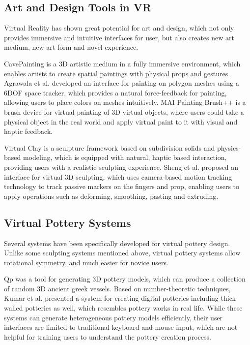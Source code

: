 \documentclass{svjour3}                     %
\begin{document}
\subsection{Art and Design Tools in VR}
\label{sec:2.2}
Virtual Reality has shown great potential for art and design, which not only provides immersive and intuitive interfaces for user, but also creates new art medium, new art form and novel experience\cite{laviola20113d}.

CavePainting \cite{keefe2001cavepainting} is a 3D artistic medium in a fully immersive environment, which enables artists to create spatial paintings with physical props and gestures. Agrawala et al.\cite{agrawala19953d} developed an interface for painting on polygon meshes using a 6DOF space tracker, which provides a natural force-feedback for painting, allowing users to place colors on meshes intuitively. MAI Painting Brush++ \cite{otsuki2017brush} is a brush device for virtual painting of 3D virtual objects, where users could take a physical object in the real world and apply virtual paint to it with visual and haptic feedback.

Virtual Clay \cite{mcdonnell2001virtual} is a sculpture framework based on subdivision solids and physics-based modeling, which is equipped with natural, haptic based interaction, providing users with a realistic sculpting experience. Sheng et al. \cite{sheng2006interface} proposed an interface for virtual 3D sculpting, which uses camera-based motion tracking technology to track passive markers on the fingers and prop, enabling users to apply operations such as deforming, smoothing, pasting and extruding.

\subsection{Virtual Pottery Systems}
\label{sec:2.3}


Several systems have been specifically developed for virtual pottery design. Unlike some sculpting systems mentioned above, virtual pottery systems allow rotational symmetry, and much easier for novice users.

Qp \cite{koutsoudis2009qp} was a tool for generating 3D pottery models, which can produce a collection of random 3D ancient greek vessels.
Based on number-theoretic techniques, Kumar et al. \cite{kumar2011wheel} presented a system for creating digital potteries including thick-walled potteries as well, which resembles pottery works in real life.
While these systems can generate heterogeneous pottery models efficiently, their user interfaces are limited to traditional keyboard and mouse input, which are not helpful for training users to understand the pottery creation process.
\end{document}
